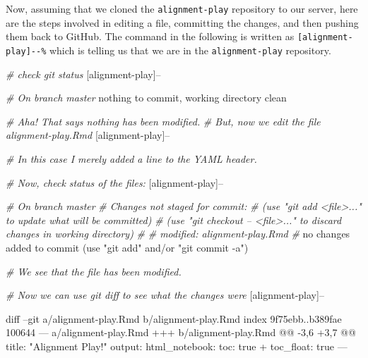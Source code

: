 \documentclass[]{krantz}
\makeatletter
\newenvironment{Shaded}{\begin{snugshade}}{\end{snugshade}}
\newcommand{\CommentTok}[1]{\textcolor[rgb]{0.37,0.37,0.37}{\textit{#1}}}
\newcommand{\ExtensionTok}[1]{#1}
\newcommand{\FunctionTok}[1]{\textcolor[rgb]{0,0,0}{#1}}
\newcommand{\NormalTok}[1]{#1}
\newcommand{\StringTok}[1]{\textcolor[rgb]{0.5,0.5,0.5}{#1}}
\newenvironment{kframe}{%
\medskip{}
\setlength{\fboxsep}{.8em}
 \def\at@end@of@kframe{}%
 \ifinner\ifhmode%
  \def\at@end@of@kframe{\end{minipage}}%
  \begin{minipage}{\columnwidth}%
 \fi\fi%
 \def\FrameCommand##1{\hskip\@totalleftmargin \hskip-\fboxsep
 \colorbox{shadecolor}{##1}\hskip-\fboxsep
     \hskip-\linewidth \hskip-\@totalleftmargin \hskip\columnwidth}%
 \MakeFramed {\advance\hsize-\width
   \@totalleftmargin\z@ \linewidth\hsize
   \@setminipage}}%
 {\par\unskip\endMakeFramed%
 \at@end@of@kframe}
\renewenvironment{Shaded}{\begin{kframe}}{\end{kframe}}
\makeatother
\begin{document}
Now, assuming that we cloned the \texttt{alignment-play} repository to our
server, here are the steps involved in editing a file, committing the
changes, and then pushing them back to GitHub. The command in the following
is written as \texttt{{[}alignment-play{]}-\/-\%} which is telling us that we are in the
\texttt{alignment-play} repository.

\begin{Shaded}
\begin{Highlighting}[]
\CommentTok{# check git status}
\NormalTok{[}\ExtensionTok{alignment-play}\NormalTok{]--%

\CommentTok{# On branch master}
\ExtensionTok{nothing}\NormalTok{ to commit, working directory clean}

\CommentTok{# Aha! That says nothing has been modified.}
\CommentTok{# But, now we edit the file alignment-play.Rmd}
\NormalTok{[}\ExtensionTok{alignment-play}\NormalTok{]--%

\CommentTok{# In this case I merely added a line to the YAML header.}

\CommentTok{# Now, check status of the files:}
\NormalTok{[}\ExtensionTok{alignment-play}\NormalTok{]--%

\CommentTok{# On branch master}
\CommentTok{# Changes not staged for commit:}
\CommentTok{#   (use "git add <file>..." to update what will be committed)}
\CommentTok{#   (use "git checkout -- <file>..." to discard changes in working directory)}
\CommentTok{#}
\CommentTok{#   modified:   alignment-play.Rmd}
\CommentTok{#}
\ExtensionTok{no}\NormalTok{ changes added to commit (use }\StringTok{"git add"}\NormalTok{ and/or }\StringTok{"git commit -a"}\NormalTok{)}

\CommentTok{# We see that the file has been modified.}

\CommentTok{# Now we can use git diff to see what the changes were}
\NormalTok{[}\ExtensionTok{alignment-play}\NormalTok{]--%

\FunctionTok{diff}\NormalTok{ --git a/alignment-play.Rmd b/alignment-play.Rmd}
\ExtensionTok{index}\NormalTok{ 9f75ebb..b389fae 100644}
\ExtensionTok{---}\NormalTok{ a/alignment-play.Rmd}
\ExtensionTok{+++}\NormalTok{ b/alignment-play.Rmd}
\ExtensionTok{@@}\NormalTok{ -3,6 +3,7 @@ title: }\StringTok{"Alignment Play!"}
 \ExtensionTok{output}\NormalTok{: }
   \ExtensionTok{html_notebook}\NormalTok{:}
     \ExtensionTok{toc}\NormalTok{: true}
\ExtensionTok{+}\NormalTok{    toc_float: true}
 \ExtensionTok{---}
 
}}}}
\end{Highlighting}
\end{Shaded}
\end{document}
